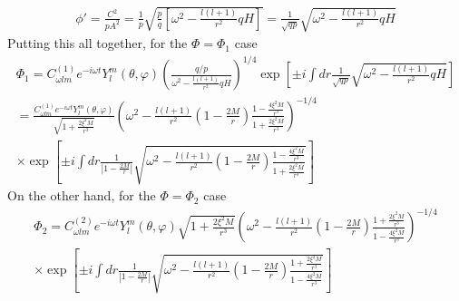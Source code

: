 \documentclass[12pt]{article}
\def\nn{\nonumber}
\begin{document}
\begin{gather}
\phi'
=
\frac{C^{2}}{p A^{2}}
=
\frac{1}{p}
\sqrt{
\frac{p}{q}
\left[
\omega^{2}
-
\frac{l (l +1)}{r^{2}}
q H
\right]}
=
\frac{1}{\sqrt{q p}}
\sqrt{
\omega^{2}
-
\frac{l (l +1)}{r^{2}}
q H}
\end{gather}
Putting this all together, for the $\Phi = \Phi_{1}$ case
\begin{gather}
\Phi_{1}
=
C_{\omega l m }^{(1)}
e^{- i \omega t}
Y_{l}^{m}(\theta, \varphi)
\left(
\frac{q/p}{\omega^{2}
-
\frac{l (l +1)}{r^{2}}
q H}
\right)^{1/4}
\exp\left[
\pm i \int dr \frac{1}{\sqrt{q p}}
\sqrt{
\omega^{2}
-
\frac{l (l +1)}{r^{2}}
q H} \right]
\nn \\
=
\frac{C_{\omega l m }^{(1)}
e^{- i \omega t}
Y_{l}^{m}(\theta, \varphi)}{\sqrt{1 + \frac{2 \xi^{2} M}{r^{3}}}}
\left(
\omega^{2}
-
\frac{l (l +1)}{r^{2}}
(1 - \frac{2 M}{r}) \frac{1 - \frac{4 \xi^{2} M}{r^{3}}}{1 + \frac{2 \xi^{2} M}{r^{3}}} 
\right)^{-1/4}
\nn \\
\times
\exp\left[
\pm i \int dr \frac{1}{|1 - \frac{2 M}{r}|}
\sqrt{
\omega^{2}
-
\frac{l (l +1)}{r^{2}}
(1 - \frac{2 M}{r}) \frac{1 - \frac{4 \xi^{2} M}{r^{3}}}{1 + \frac{2 \xi^{2} M}{r^{3}}} }\right]
\end{gather}
On the other hand, for the $\Phi = \Phi_{2}$ case
\begin{gather}
\Phi_{2}
=
C_{\omega l m }^{(2)}
e^{- i \omega t}
Y_{l}^{m}(\theta, \varphi)
\sqrt{1 + \frac{2 \xi^{2} M}{r^{3}}}
\left(
\omega^{2}
-
\frac{l (l +1)}{r^{2}}
(1 - \frac{2 M}{r}) \frac{1 + \frac{2 \xi^{2} M}{r^{3}}}{1 - \frac{4 \xi^{2} M}{r^{3}}} 
\right)^{-1/4}
\nn \\
\times
\exp\left[
\pm i \int dr \frac{1}{|1 - \frac{2 M}{r}|}
\sqrt{
\omega^{2}
-
\frac{l (l +1)}{r^{2}}
(1 - \frac{2 M}{r}) \frac{1+ \frac{2 \xi^{2} M}{r^{3}}}{1 - \frac{4 \xi^{2} M}{r^{3}}} }\right]
\end{gather}































%
%
\end{document}
